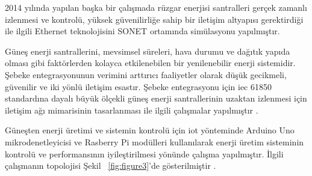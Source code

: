 2014 yılında yapılan başka bir çalışmada \cite{hussain2014multilayer} rüzgar enerjisi santralleri gerçek zamanlı izlenmesi ve kontrolü, yüksek güvenilirliğe sahip bir iletişim altyapısı gerektirdiği ile ilgili Ethernet teknolojisini SONET ortamında simülasyonu yapılmıştır.

Güneş enerji santrallerini, mevsimsel süreleri, hava durumu ve dağıtık yapıda olması gibi faktörlerden kolayca etkilenebilen bir yenilenebilir enerji sistemidir. Şebeke entegrasyonunun verimini arttırıcı faaliyetler olarak düşük gecikmeli, güvenilir ve iki yönlü iletişim esastır. Şebeke entegrasyonu için \gls{iec} 61850 standardına dayalı büyük ölçekli güneş enerji santrallerinin uzaktan izlenmesi için iletişim ağı mimarisinin tasarlanması ile ilgili çalışmalar yapılmıştır \cite{mackiewicz2006overview}.

Güneşten enerji üretimi ve sistemin kontrolü için \gls{iot} yönteminde Arduino Uno mikrodenetleyicisi ve Rasberry Pi modülleri kullanılarak enerji üretim sisteminin kontrolü ve performansının iyileştirilmesi yönünde çalışma yapılmıştır. İlgili çalışmanın topolojisi Şekil ~\ref{fig:figure3}'de gösterilmiştir \cite{deshmukh2018smart}.

